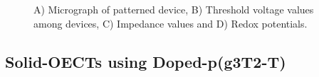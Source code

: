 \begin{figure}[ht]
    \caption[Performance of solid-OECT with drop-casted SSE]{A) Micrograph of patterned device, B) Threshold voltage values among devices, C) Impedance values and D) Redox potentials.}
    \label{fig:printedSSE}
\end{figure}

\subsection{Solid-OECTs using Doped-p(g3T2-T)} \label{dopedOECTs}





